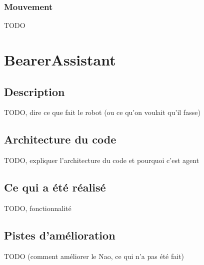 \documentclass{article}
\begin{document}
\subsubsection{Mouvement}
TODO


\section{BearerAssistant}

\subsection{Description}
TODO, dire ce que fait le robot (ou ce qu'on voulait qu'il fasse)
\subsection{Architecture du code}
TODO, expliquer l'architecture du code et pourquoi c'est agent
\subsection{Ce qui a été réalisé}
TODO, fonctionnalité
\subsection{Pistes d'amélioration}
TODO (comment améliorer le Nao, ce qui n'a pas été fait)
\end{document}
